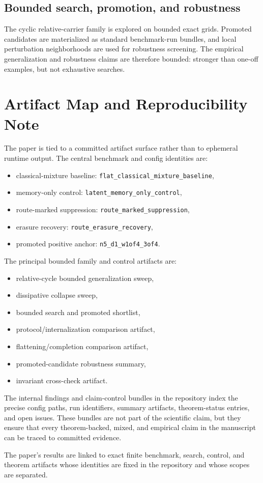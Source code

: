 \documentclass[11pt]{article}
\theoremstyle{definition}
\begin{document}
\subsection{Bounded search, promotion, and robustness}

The cyclic relative-carrier family is explored on bounded exact grids. Promoted candidates are materialized as standard benchmark-run bundles, and local perturbation neighborhoods are used for robustness screening. The empirical generalization and robustness claims are therefore bounded: stronger than one-off examples, but not exhaustive searches.
 \section{Artifact Map and Reproducibility Note}

The paper is tied to a committed artifact surface rather than to ephemeral runtime output. The central benchmark and config identities are:

\begin{itemize}
\item classical-mixture baseline: \texttt{flat\_classical\_mixture\_baseline},
\item memory-only control: \texttt{latent\_memory\_only\_control},
\item route-marked suppression: \texttt{route\_marked\_suppression},
\item erasure recovery: \texttt{route\_erasure\_recovery},
\item promoted positive anchor: \texttt{n5\_d1\_w1of4\_3of4}.
\end{itemize}

The principal bounded family and control artifacts are:
\begin{itemize}
\item relative-cycle bounded generalization sweep,
\item dissipative collapse sweep,
\item bounded search and promoted shortlist,
\item protocol/internalization comparison artifact,
\item flattening/completion comparison artifact,
\item promoted-candidate robustness summary,
\item invariant cross-check artifact.
\end{itemize}

The internal findings and claim-control bundles in the repository index the precise config paths, run identifiers, summary artifacts, theorem-status entries, and open issues. These bundles are not part of the scientific claim, but they ensure that every theorem-backed, mixed, and empirical claim in the manuscript can be traced to committed evidence.

The paper's results are linked to exact finite benchmark, search, control, and theorem artifacts whose identities are fixed in the repository and whose scopes are separated.
 


\end{document}
